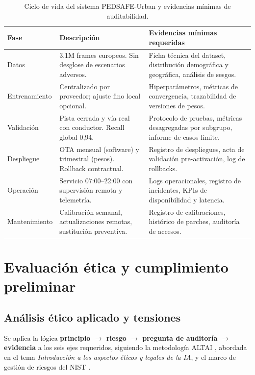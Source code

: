 \documentclass[11pt]{article}
\begin{document}
\begin{table}[h]
\centering\small
\begin{tabularx}{\textwidth}{l X X}
\toprule
\textbf{Fase} & \textbf{Descripción} & \textbf{Evidencias mínimas requeridas} \\ \midrule
Datos & 3,1M frames europeos. Sin desglose de escenarios adversos. & Ficha técnica del dataset, distribución demográfica y geográfica, análisis de sesgos. \\ \addlinespace
Entrenamiento & Centralizado por proveedor; ajuste fino local opcional. & Hiperparámetros, métricas de convergencia, trazabilidad de versiones de pesos. \\ \addlinespace
Validación & Pista cerrada y vía real con conductor. Recall global 0,94. & Protocolo de pruebas, métricas desagregadas por subgrupo, informe de casos límite. \\ \addlinespace
Despliegue & OTA mensual (software) y trimestral (pesos). Rollback contractual. & Registro de despliegues, acta de validación pre-activación, log de rollbacks. \\ \addlinespace
Operación & Servicio 07:00--22:00 con supervisión remota y telemetría. & Logs operacionales, registro de incidentes, KPIs de disponibilidad y latencia. \\ \addlinespace
Mantenimiento & Calibración semanal, actualizaciones remotas, sustitución preventiva. & Registro de calibraciones, histórico de parches, auditoría de accesos. \\ \bottomrule
\end{tabularx}
\caption{Ciclo de vida del sistema PEDSAFE-Urban y evidencias mínimas de auditabilidad.}
\end{table}


\section{Evaluación ética y cumplimiento preliminar}

\subsection{Análisis ético aplicado y tensiones}

Se aplica la lógica \textbf{principio $\rightarrow$ riesgo $\rightarrow$ pregunta de auditoría $\rightarrow$ evidencia} a los seis ejes requeridos, siguiendo la metodología ALTAI \parencite{altai2020}, abordada en el tema \textit{Introducción a los aspectos éticos y legales de la IA}, y el marco de gestión de riesgos del NIST \parencite{nistrmf}.
\end{document}
